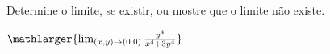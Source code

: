 Determine o limite, se existir, ou mostre que o limite não existe.

\item$\mathlarger{\lim_{(x,y)\rightarrow(0,0)} \frac{y^4}{x^4+3y^4}}$